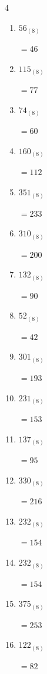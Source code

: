 \begin{multicols}{4}
\begin{enumerate}
        $=182$

  \item $56_{(8)}$

        $=46$

  \item $115_{(8)}$

        $=77$

  \item $74_{(8)}$

        $=60$

  \item $160_{(8)}$

        $=112$

\columnbreak %

  \item $351_{(8)}$

        $=233$

  \item $310_{(8)}$

        $=200$

  \item $132_{(8)}$

        $=90$

  \item $52_{(8)}$

        $=42$

  \item $301_{(8)}$

        $=193$

  \item $231_{(8)}$

        $=153$

  \item $137_{(8)}$

        $=95$

  \item $330_{(8)}$

        $=216$

  \item $232_{(8)}$

        $=154$

  \item $232_{(8)}$

        $=154$

  \item $375_{(8)}$

        $=253$

  \item $122_{(8)}$

        $=82$


\end{enumerate}
\end{multicols}

